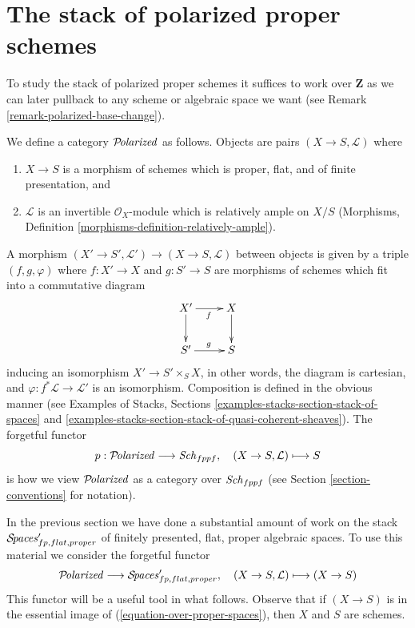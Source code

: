 \section{The stack of polarized proper schemes}
\label{section-polarized}

\noindent
To study the stack of polarized proper schemes it suffices to work
over $\mathbf{Z}$ as we can later pullback to any scheme or algebraic
space we want (see Remark \ref{remark-polarized-base-change}).

\begin{situation}
\label{situation-polarized}
We define a category $\mathcal{P}\!\mathit{olarized}$ as follows. Objects are
pairs $(X \to S, \mathcal{L})$ where
\begin{enumerate}
\item $X \to S$ is a morphism of schemes which is proper, flat, and
of finite presentation, and
\item $\mathcal{L}$ is an invertible $\mathcal{O}_X$-module
which is relatively ample on $X/S$
(Morphisms, Definition \ref{morphisms-definition-relatively-ample}).
\end{enumerate}
A morphism $(X' \to S', \mathcal{L}') \to (X \to S, \mathcal{L})$
between objects
is given by a triple $(f, g, \varphi)$ where $f : X' \to X$ and $g : S' \to S$
are morphisms of schemes which fit into a commutative diagram
$$
\xymatrix{
X' \ar[d] \ar[r]_f & X \ar[d] \\
S' \ar[r]^g & S
}
$$
inducing an isomorphism $X' \to S' \times_S X$, in other words, the
diagram is cartesian,
and $\varphi : f^*\mathcal{L} \to \mathcal{L}'$ is an isomorphism.
Composition is defined in the obvious manner (see
Examples of Stacks, Sections
\ref{examples-stacks-section-stack-of-spaces} and
\ref{examples-stacks-section-stack-of-quasi-coherent-sheaves}).
The forgetful functor
$$
p : \mathcal{P}\!\mathit{olarized} \longrightarrow \mathit{Sch}_{fppf},\quad
(X \to S, \mathcal{L}) \longmapsto S
$$
is how we view $\mathcal{P}\!\mathit{olarized}$ as a category over $\mathit{Sch}_{fppf}$
(see Section \ref{section-conventions} for notation).
\end{situation}

\noindent
In the previous section we have done a substantial amount of work on the stack
$\mathcal{S}\!\mathit{paces}'_{fp, flat, proper}$
of finitely presented, flat, proper algebraic spaces. To use this material
we consider the forgetful functor
\begin{equation}
\label{equation-over-proper-spaces}
\mathcal{P}\!\mathit{olarized} \longrightarrow
\mathcal{S}\!\mathit{paces}'_{fp, flat, proper},\quad
(X \to S, \mathcal{L}) \longmapsto (X \to S)
\end{equation}
This functor will be a useful tool in what follows.
Observe that if $(X \to S)$ is in the essential image
of (\ref{equation-over-proper-spaces}), then
$X$ and $S$ are schemes.

